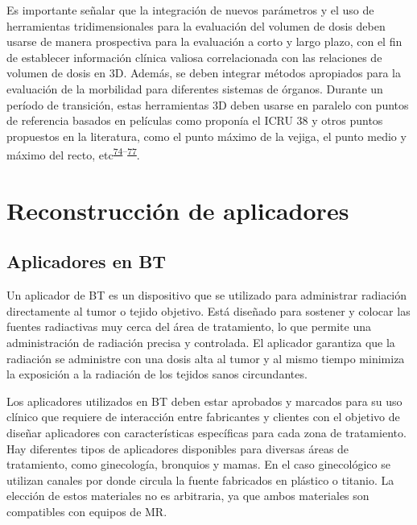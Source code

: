\documentclass[
  a4paper,
]{scrreprt}
\begin{document}
Es importante señalar que la integración de nuevos parámetros y el uso
de herramientas tridimensionales para la evaluación del volumen de dosis
deben usarse de manera prospectiva para la evaluación a corto y largo
plazo, con el fin de establecer información clínica valiosa
correlacionada con las relaciones de volumen de dosis en 3D. Además, se
deben integrar métodos apropiados para la evaluación de la morbilidad
para diferentes sistemas de órganos. Durante un período de transición,
estas herramientas 3D deben usarse en paralelo con puntos de referencia
basados en películas como proponía el ICRU 38 y otros puntos propuestos
en la literatura, como el punto máximo de la vejiga, el punto medio y
máximo del recto,
etc\textsuperscript{\protect\hyperlink{ref-srivastava2014}{74}--\protect\hyperlink{ref-kim2007}{77}}.

\hypertarget{reconstrucciuxf3n-de-aplicadores}{%
\section{Reconstrucción de
aplicadores}\label{reconstrucciuxf3n-de-aplicadores}}

\hypertarget{aplicadores-en-bt}{%
\subsection{Aplicadores en BT}\label{aplicadores-en-bt}}

Un aplicador de BT es un dispositivo que se utilizado para administrar
radiación directamente al tumor o tejido objetivo. Está diseñado para
sostener y colocar las fuentes radiactivas muy cerca del área de
tratamiento, lo que permite una administración de radiación precisa y
controlada. El aplicador garantiza que la radiación se administre con
una dosis alta al tumor y al mismo tiempo minimiza la exposición a la
radiación de los tejidos sanos circundantes.

Los aplicadores utilizados en BT deben estar aprobados y marcados para
su uso clínico que requiere de interacción entre fabricantes y clientes
con el objetivo de diseñar aplicadores con características específicas
para cada zona de tratamiento. Hay diferentes tipos de aplicadores
disponibles para diversas áreas de tratamiento, como ginecología,
bronquios y mamas. En el caso ginecológico se utilizan canales por donde
circula la fuente fabricados en plástico o titanio. La elección de estos
materiales no es arbitraria, ya que ambos materiales son compatibles con
equipos de MR.
\end{document}
